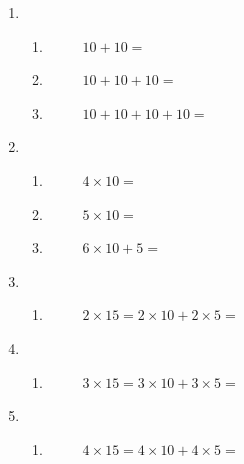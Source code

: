\documentclass[a4paper,12pt]{article}
\begin{document}
\begin{enumerate}
	\item \begin{enumerate}
		\item ~~~~~$ 10 + 10 =$
		\item ~~~~~$ 10 + 10 + 10 =$  
		\item ~~~~~$ 10 + 10 + 10 +10 =$
	\end{enumerate}
	\item \begin{enumerate}
		\item ~~~~~$ 4 \times 10 =$
		\item ~~~~~$ 5 \times 10 =$  
		\item ~~~~~$ 6 \times 10 + 5 =$
	\end{enumerate}
	\item \begin{enumerate}
		\item ~~~~~$ 2 \times 15 = 2 \times 10 + 2 \times 5 = $
	\end{enumerate}
	\item \begin{enumerate}
		\item ~~~~~$ 3 \times 15 = 3 \times 10 + 3 \times 5 =$
	\end{enumerate}
	\item \begin{enumerate}
		\item ~~~~~$ 4 \times 15 = 4 \times 10 + 4 \times 5 =$
	\end{enumerate}
\end{enumerate}
\end{document}
